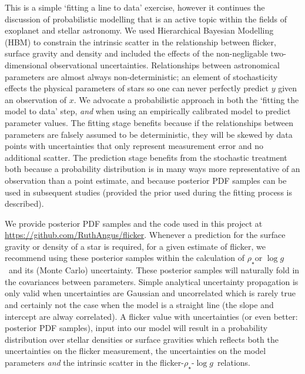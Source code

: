 \documentclass[apjl]{emulateapj}
\newcommand{\logg}{$\log g$}
\newcommand{\rhostar}{$\rho_{\star}$}
\begin{document}
This is a simple `fitting a line to data' exercise, however it continues the
discussion of probabilistic modelling that is an active topic within the
fields of exoplanet and stellar astronomy.
We used Hierarchical Bayesian Modelling (HBM) to constrain the intrinsic
scatter in the relationship between flicker, surface gravity and density and
included the effects of the non-negligable two-dimensional observational
uncertainties.
Relationships between astronomical parameters are almost always
non-deterministic; an element of stochasticity effects the physical parameters
of stars so one can never perfectly predict $y$ given an observation of $x$.
We advocate a probabilistic approach in both the `fitting the model to data'
step, {\it and} when using an empirically calibrated model to predict
parameter values.
The fitting stage benefits because if the relationships between parameters are
falsely assumed to be deterministic, they will be skewed by data points with
uncertainties that only represent measurement error and no additional scatter.
The prediction stage benefits from the stochastic treatment both because a
probability distribution is in many ways more representative of an observation
than a point estimate, and because posterior PDF samples can be used in
subsequent studies (provided the prior used during the fitting process is
described).

We provide posterior PDF samples and the code used in this project at
\url{https://github.com/RuthAngus/flicker}.
Whenever a prediction for the surface gravity or density of a star is required,
for a given estimate of flicker, we recommend using these posterior samples
within the calculation of \rhostar or \logg\ and its (Monte Carlo)
uncertainty.
These posterior samples will naturally fold in the covariances between
parameters.
Simple analytical uncertainty propagation is only valid when uncertainties are
Gaussian and uncorrelated which is rarely true and certainly not the case when
the model is a straight line (the slope and intercept are alway correlated).
A flicker value with uncertainties (or even better: posterior PDF
samples), input into our model will result in a probability distribution over
stellar densities or surface gravities which reflects both the uncertainties
on the flicker measurement, the uncertainties on the model parameters {\it and}
the intrinsic scatter in the flicker-\rhostar-\logg\ relations.
\end{document}

